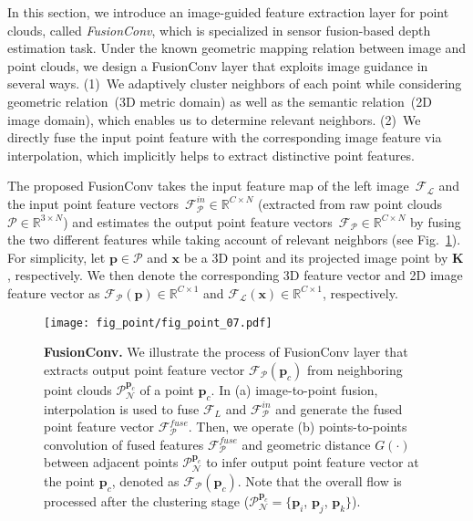 \documentclass[letterpaper, 10 pt, conference]{ieeeconf}
\newcommand{\Fref}[1]{Fig.~\textcolor{blue}{\ref{#1}}}
\begin{document}
In this section, we introduce an image-guided feature extraction layer for point clouds, called \emph{FusionConv}, which is specialized in sensor fusion-based depth estimation task. Under the known geometric mapping relation between image and point clouds, we design a FusionConv layer that exploits image guidance in several ways. (1)~We adaptively cluster neighbors of each point while considering geometric relation~(3D metric domain) as well as the semantic relation~(2D image domain), which enables us to determine relevant neighbors. (2)~We directly fuse the input point feature with the corresponding image feature via interpolation, which implicitly helps to extract distinctive point features. 


The proposed FusionConv takes the input feature map of the left image~$\mathcal{F}_{\mathcal{L}}$ and the input point feature vectors~$\mathcal{F}_{\mathcal{P}}^{in} \in \mathbb{R}^{C \times N}$ (extracted from raw point clouds~$\mathcal{P}\in \mathbb{R}^{3 \times N}$) and estimates the output point feature vectors~${\mathcal{F}}_{\mathcal{P}} \in \mathbb{R}^{C \times N}$ by fusing the two different features while taking account of relevant neighbors (see \Fref{fig:fig_point}). For simplicity, let $\textbf{p}\in\mathcal{P}$ and $\textbf{x}$ be a 3D point and its projected image point by $\mathbf{K}$, respectively. We then denote the corresponding 3D feature vector and 2D image feature vector as $\mathcal{F}_{\mathcal{P}}(\textbf{p}) \in \mathbb{R}^{C \times 1}$ and $\mathcal{F}_{\mathcal{L}}(\textbf{x}) \in \mathbb{R}^{C \times 1}$, respectively.


\begin{figure}[!t]
    \vspace{+3mm}
    \centering
    \texttt{[image: fig\_point/fig\_point\_07.pdf]}
\caption{\textbf{FusionConv.} 
    We illustrate the process of FusionConv layer that extracts output point feature vector $\mathcal{F}_{\mathcal{P}}(\textbf{p}_{c})$ from neighboring point clouds $\mathcal{P}^{\textbf{p}_{c}}_{\mathcal{N}}$ of a point $\textbf{p}_{c}$. 
    In (a) image-to-point fusion, interpolation is used to fuse $\mathcal{F}_{L}$ and $\mathcal{F}_{\mathcal{P}}^{in}$ and generate the fused point feature vector $\mathcal{F}_{\mathcal{P}}^{fuse}$.
    Then, we operate (b) points-to-points convolution of fused features $\mathcal{F}_{\mathcal{P}}^{fuse}$ and geometric distance $G(\cdot)$ between adjacent points $\mathcal{P}^{\textbf{p}_{c}}_{\mathcal{N}}$ to infer output point feature vector at the point $\textbf{p}_{c}$, denoted as $\mathcal{F}_{\mathcal{P}}(\textbf{p}_{c})$.
    Note that the overall flow is processed after the clustering stage {($\mathcal{P}^{\textbf{p}_{c}}_{\mathcal{N}} = \{ \textbf{p}_{i}$, $\textbf{p}_{j}$, $\textbf{p}_{k} \} $).}
    }
    \label{fig:fig_point}
\end{figure}
\end{document}
